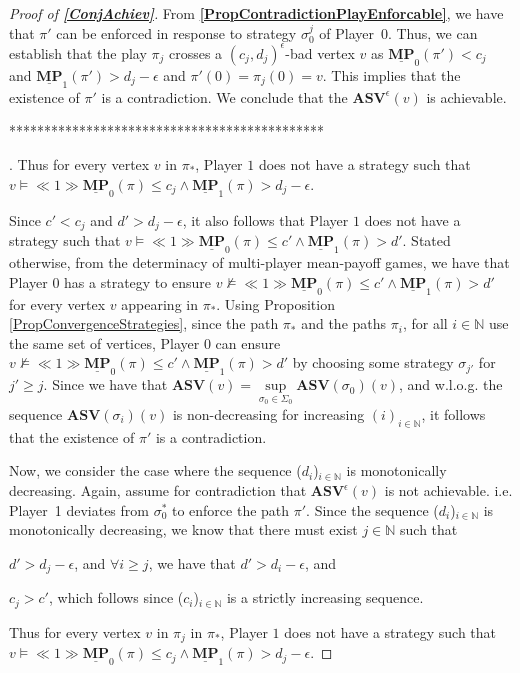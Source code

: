 \begin{proof}[Proof of \textbf{\cref{ConjAchiev}}]
From \textbf{\cref{PropContradictionPlayEnforcable}}, we have that $\pi'$ can be enforced in response to strategy $\sigma_0^j$ of Player~0. Thus, we can establish that the play $\pi_j$ crosses a $(c_j, d_j)^{\epsilon}$-bad vertex $v$ as $\underline{\mathbf{MP}}_0(\pi') < c_j$ and $ \underline{\mathbf{MP}}_1(\pi') > d_j-\epsilon$ and $\pi'(0) = \pi_j(0) = v$. This implies that the existence of $\pi'$ is a contradiction. We conclude that the $\mathbf{ASV}^{\epsilon}(v)$ is achievable.

*********************************************

.
Thus for every vertex $v$ in $\pi_*$, Player $1$ does not have a strategy such that $v \models \ll 1 \gg \underline{\mathbf{MP}}_0(\pi) \leqslant c_j \land \underline{\mathbf{MP}}_1(\pi) > d_j-\epsilon$.

Since $c' < c_j$ and $d' > d_j-\epsilon$, it also follows that Player $1$ does not have a strategy such that $v \models \ll 1 \gg \underline{\mathbf{MP}}_0(\pi) \leqslant c' \land \underline{\mathbf{MP}}_1(\pi) > d'$.
Stated otherwise, from the determinacy of multi-player mean-payoff games, we have that Player $0$ has a strategy to ensure $v \not \models \ll 1 \gg \underline{\mathbf{MP}}_0(\pi) \leqslant c' \land \underline{\mathbf{MP}}_1(\pi) > d'$ for every vertex $v$ appearing in $\pi_*$.
Using Proposition \ref{PropConvergenceStrategies}, since the path $\pi_*$ and the paths $\pi_i$, for all $i \in \mathbb{N}$ use the same set of vertices, Player $0$ can ensure $v \not \models \ll 1 \gg \underline{\mathbf{MP}}_0(\pi) \leqslant c' \land \underline{\mathbf{MP}}_1(\pi) > d'$ by choosing some strategy $\sigma_{j'}$ for $j' \ge j$.
Since we have that $\mathbf{ASV}(v) = \sup\limits_{\sigma_0 \in \Sigma_0} \mathbf{ASV}(\sigma_0)(v)$, and w.l.o.g. the sequence $\mathbf{ASV}(\sigma_i)(v)$ is non-decreasing for increasing $(i)_{i \in \mathbb{N}}$, it follows that the existence of $\pi'$ is a contradiction.

Now, we consider the case where the sequence ($d_i$)$_{i \in \mathbb{N}}$ is monotonically decreasing.
Again, assume for contradiction that $\mathbf{ASV}^{\epsilon}(v)$ is not achievable.  i.e. Player~1 deviates from $\sigma_0^*$ to enforce the path $\pi'$.
Since the sequence ($d_i$)$_{i \in \mathbb{N}}$ is monotonically decreasing, we know that there must exist $j \in \mathbb{N}$ such that 
\begin{inparaenum}[(i)]
\item $d' > d_j - \epsilon$, and $\forall i \geqslant j$, we have that $d' > d_i - \epsilon$, and
\item $c_j > c'$, which follows since ($c_i$)$_{i \in \mathbb{N}}$ is a strictly increasing sequence.
\end{inparaenum}
Thus for every vertex $v$ in $\pi_j$ in $\pi_*$, Player $1$ does not have a strategy such that $v \models \ll 1 \gg \underline{\mathbf{MP}}_0(\pi) \leqslant c_j \land \underline{\mathbf{MP}}_1(\pi) > d_j-\epsilon$.


\end{proof}
